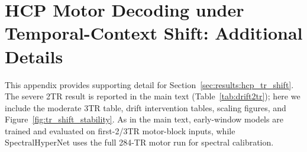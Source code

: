 \documentclass{article}
\begin{document}
%
%

\section{HCP Motor Decoding under Temporal-Context Shift: Additional Details}
\label{sec:appx:hcp_tr_shift}

This appendix provides supporting detail for Section~\ref{sec:results:hcp_tr_shift}. The severe 2TR result is reported in the main text (Table~\ref{tab:drift2tr}); here we include the moderate 3TR table, drift intervention tables, scaling figures, and Figure~\ref{fig:tr_shift_stability}. As in the main text, early-window models are trained and evaluated on first-2/3TR motor-block inputs, while SpectralHyperNet uses the full 284-TR motor run for spectral calibration.
\end{document}
